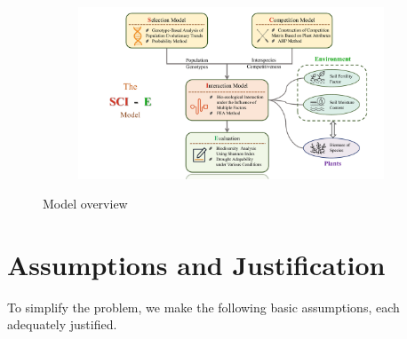 \documentclass{mcmthesis}
\begin{document}
\begin{figure}[h]
\centering
\begin{subfigure}{0.82 \textwidth}
\includegraphics[width=\textwidth]{img/process.pdf}
\end{subfigure}
\caption{Model overview}
\label{fig:model}
\end{figure}

\section{Assumptions and Justification}

\indent

To simplify the problem, we make the following basic assumptions, each adequately justified.
\end{document}
